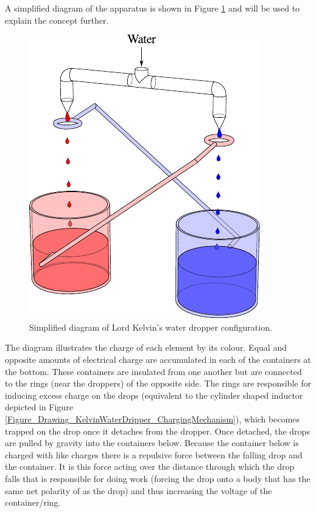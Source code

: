 A simplified diagram of the apparatus is shown in Figure \ref{Fig_Diagram_KelvinWaterDripper}
and will be used to explain the concept further.
\begin{figure}[H]
\begin{centering}
\includegraphics{content/appendices/chargedWaterDrops/graphics/DripperOut}
\par\end{centering}

\protect\caption{Simplified diagram of Lord Kelvin's water dropper configuration.}


\label{Fig_Diagram_KelvinWaterDripper}
\end{figure}


The diagram illustrates the charge of each element by its colour.
Equal and opposite amounts of electrical charge are accumulated in
each of the containers at the bottom. These containers are insulated
from one another but are connected to the rings (near the droppers)
of the opposite side. The rings are responsible for inducing excess
charge on the drops (equivalent to the cylinder shaped inductor depicted
in Figure \ref{Figure_Drawing_KelvinWaterDripper_ChargingMechanism}),
which becomes trapped on the drop once it detaches from the dropper.
Once detached, the drops are pulled by gravity into the containers
below. Because the container below is charged with like charges there
is a repulsive force between the falling drop and the container. It
is this force acting over the distance through which the drop falls
that is responsible for doing work (forcing the drop onto a body that
has the same net polarity of as the drop) and thus increasing the
voltage of the container/ring.


